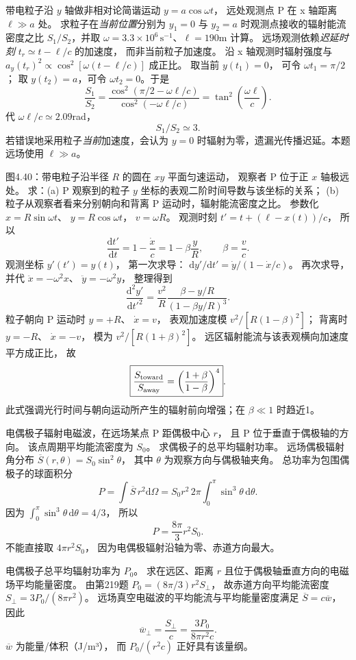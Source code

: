 带电粒子沿 $y$ 轴做非相对论简谐运动 $y=a\cos\omega t$，
远处观测点 P 在 x 轴距离 $\ell\gg a$ 处。
求粒子在\emph{当前位置}分别为
$y_1=0$ 与 $y_2=a$ 时观测点接收的辐射能流密度之比
$S_1/S_2$，并取
$\omega=3.3\times10^6\,\mathrm{s^{-1}}$、$\ell=190$m 计算。
\exsolution
远场观测依赖\emph{迟延时刻}
$t_r\simeq t-\ell/c$ 的加速度，
而非当前粒子加速度。
沿 x 轴观测时辐射强度与
$a_y(t_r)^2\propto\cos^2[\omega(t-\ell/c)]$ 成正比。
取当前 $y(t_1)=0$，
可令 $\omega t_1=\pi/2$；
取 $y(t_2)=a$，可令
$\omega t_2=0$。于是
\[
\frac{S_1}{S_2}
=\frac{\cos^2(\pi/2-\omega\ell/c)}
{\cos^2(-\omega\ell/c)}
=\boxed{\tan^2\left(\frac{\omega\ell}{c}\right)}.
\]
代 $\omega\ell/c\simeq2.09$rad，
\[
\boxed{S_1/S_2\simeq3}.
\]
\excheck 若错误地采用粒子\emph{当前}加速度，会认为 $y=0$ 时辐射为零，遗漏光传播迟延。本题远场使用 $\ell\gg a$。

图4.40：带电粒子沿半径 $R$ 的圆在 $xy$ 平面匀速运动，
观察者 P 位于正 $x$ 轴极远处。
求：(a) P 观察到的粒子 $y$ 坐标的表观二阶时间导数与该坐标的关系；
(b) 粒子从观察者看来分别朝向和背离 P 运动时，辐射能流密度之比。
\exsolution
参数化
$x=R\sin\omega t$、
$y=R\cos\omega t$，
$v=\omega R$。
观测时刻
$t'=t+(\ell-x(t))/c$，
所以
\[
\frac{\mathrm dt'}{\mathrm dt}
=1-\frac{\dot x}{c}
=1-\beta\frac yR,\qquad
\beta=\frac vc.
\]
观测坐标 $y'(t')=y(t)$，
第一次求导：
$\mathrm dy'/\mathrm dt'
=\dot y/(1-\dot x/c)$。
再次求导，并代
$\ddot x=-\omega^2x$、
$\ddot y=-\omega^2y$，
整理得到
\[
\boxed{\frac{\mathrm d^2y'}{\mathrm dt'^2}
=\frac{v^2}{R}
\frac{\beta-y/R}{(1-\beta y/R)^3}}.
\]
粒子朝向 P 运动时 $y=+R$、
$\dot x=v$，
表观加速度模
$v^2/[R(1-\beta)^2]$；
背离时 $y=-R$、
$\dot x=-v$，
模为 $v^2/[R(1+\beta)^2]$。
远区辐射能流与该表观横向加速度平方成正比，
故
\[
\boxed{\frac{S_{\rm toward}}{S_{\rm away}}
=\left(\frac{1+\beta}{1-\beta}\right)^4}.
\]
\excheck 此式强调光行时间与朝向运动所产生的辐射前向增强；在 $\beta\ll1$ 时趋近1。

电偶极子辐射电磁波，在远场某点 P 距偶极中心 $r$，
且 P 位于垂直于偶极轴的方向。
该点周期平均能流密度为 $S_0$。
求偶极子的总平均辐射功率。
\exsolution
远场偶极辐射角分布
$\overline S(r,\theta)=S_0\sin^2\theta$，
其中 $\theta$ 为观察方向与偶极轴夹角。
总功率为包围偶极子的球面积分
\[
P=\int\overline S\,r^2\mathrm d\Omega
=S_0r^2\,2\pi\int_0^\pi\sin^3\theta\,\mathrm d\theta.
\]
因为
$\int_0^\pi\sin^3\theta\,\mathrm d\theta=4/3$，
所以
\[
\boxed{P=\frac{8\pi}{3}r^2S_0}.
\]
\excheck 不能直接取 $4\pi r^2S_0$，
因为电偶极辐射沿轴为零、赤道方向最大。

电偶极子总平均辐射功率为 $P_0$。
求在远区、距离 $r$ 且位于偶极轴垂直方向的电磁场平均能量密度。
\exsolution
由第219题
$P_0=(8\pi/3)r^2S_\perp$，
故赤道方向平均能流密度
$S_\perp=3P_0/(8\pi r^2)$。
远场真空电磁波的平均能流与平均能量密度满足
$\overline S=c\overline w$，
因此
\[
\boxed{\overline w_\perp
=\frac{S_\perp}{c}
=\frac{3P_0}{8\pi r^2c}}.
\]
\excheck $\overline w$ 为能量/体积（J/m³），
而 $P_0/(r^2c)$ 正好具有该量纲。

